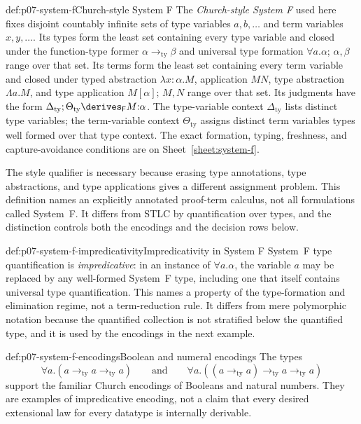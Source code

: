 \begin{hbdefinition}{def:p07-system-f}{Church-style System F}
The \emph{Church-style System F} used here fixes disjoint countably infinite
sets of type variables \(a,b,\ldots\) and term variables
\(x,y,\ldots\).  Its types form the least set containing every type variable
and closed under the function-type former
\(\alpha\mathbin{\to_{\mathrm{ty}}}\beta\) and universal type formation
\(\forall a.\alpha\); \(\alpha,\beta\) range over that set.  Its terms form
the least set containing every term variable and closed under typed
abstraction \(\lambda x{:}\alpha.M\), application \(MN\), type abstraction
\(\Lambda a.M\), and type application \(M[\alpha]\); \(M,N\) range over that
set.  Its judgments have the form
\(\Delta_{\mathrm{ty}};\Theta_{\mathrm{ty}}\derives_{\mathsf F}M{:}\alpha\).
The type-variable context \(\Delta_{\mathrm{ty}}\) lists distinct type
variables; the term-variable context \(\Theta_{\mathrm{ty}}\) assigns
distinct term variables types well formed over that type context.  The exact
formation, typing, freshness, and capture-avoidance conditions are on
Sheet~\ref{sheet:system-f}.

The style qualifier is necessary because erasing type annotations, type
abstractions, and type applications gives a different assignment problem.
This definition names an explicitly annotated proof-term calculus, not all
formulations called System~F.  It differs from STLC by quantification over
types, and the distinction controls both the encodings and the decision rows
below.
\end{hbdefinition}

\begin{hbdefinition}{def:p07-system-f-impredicativity}{Impredicativity in System F}
System~F type quantification is \emph{impredicative}: in an instance of
\(\forall a.\alpha\), the variable \(a\) may be replaced by any well-formed
System~F type, including one that itself contains universal type
quantification.  This names a property of the type-formation and elimination
regime, not a term-reduction rule.  It differs from mere polymorphic notation
because the quantified collection is not stratified below the quantified
type, and it is used by the encodings in the next example.
\end{hbdefinition}

\begin{hbexample}{def:p07-system-f-encodings}{Boolean and numeral encodings}
The types
\[
  \forall a.(a\mathbin{\to_{\mathrm{ty}}}a
    \mathbin{\to_{\mathrm{ty}}}a)
  \qquad\text{and}\qquad
  \forall a.((a\mathbin{\to_{\mathrm{ty}}}a)
    \mathbin{\to_{\mathrm{ty}}}a\mathbin{\to_{\mathrm{ty}}}a)
\]
support the familiar Church encodings of Booleans and natural numbers.  They
are examples of impredicative encoding, not a claim that every desired
extensional law for every datatype is internally derivable.
\end{hbexample}

